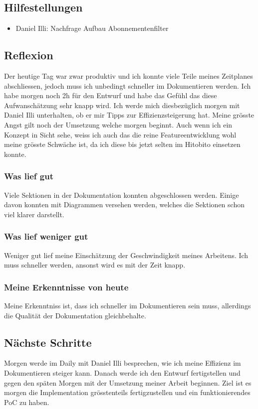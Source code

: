 \subsection*{Hilfestellungen}
\begin{itemize}
    \item Daniel Illi: Nachfrage Aufbau Abonnementenfilter
\end{itemize}

\subsection*{Reflexion}
Der heutige Tag war zwar produktiv und ich konnte viele Teile meines Zeitplanes abschliessen, jedoch muss ich unbedingt schneller im Dokumentieren werden.
Ich habe morgen noch 2h für den Entwurf und habe das Gefühl das diese Aufwanschätzung sehr knapp wird. Ich werde mich diesbezüglich morgen mit Daniel Illi unterhalten,
ob er mir Tipps zur Effizienzsteigerung hat. Meine grösste Angst gilt noch der Umsetzung welche morgen beginnt. Auch wenn ich ein Konzept in Sicht sehe, weiss ich auch das
die reine Featureentwicklung wohl meine grösste Schwäche ist, da ich diese bis jetzt selten im Hitobito einsetzen konnte.

\subsubsection*{Was lief gut}
Viele Sektionen in der Dokumentation konnten abgeschlossen werden. Einige davon konnten mit Diagrammen versehen werden, welches die Sektionen schon viel
klarer darstellt.

\subsubsection*{Was lief weniger gut}
Weniger gut lief meine Einschätzung der Geschwindigkeit meines Arbeitens. Ich muss schneller werden, ansonst wird es mit der Zeit knapp.

\subsubsection*{Meine Erkenntnisse von heute}
Meine Erkenntniss ist, dass ich schneller im Dokumentieren sein muss, allerdings die Qualität der Dokumentation gleichbehalte.

\subsection*{Nächste Schritte}
Morgen werde im Daily mit Daniel Illi besprechen, wie ich meine Effizienz im Dokumentieren steiger kann. Danach werde ich den Entwurf fertigstellen
und gegen den späten Morgen mit der Umsetzung meiner Arbeit beginnen. Ziel ist es morgen die Implementation grösstenteils fertigzustellen und ein funktionierendes
PoC zu haben. 

\pagebreak
